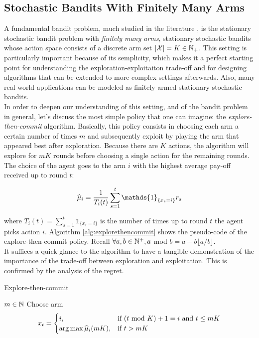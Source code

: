 \subsection{Stochastic Bandits With Finitely Many Arms}
A fundamental bandit problem, much studied in the literature \cite{lattimore2019bandit}, is the stationary stochastic bandit problem with \emph{finitely many arms}, \ie stationary stochastic bandits whose action space consists of a discrete arm set $|\mathcal{X}| = K \in \mathbb{N}_{+}$. This setting is particularly important because of its semplicity, which makes it a perfect starting point for understanding the exploration-exploitaiton trade-off and for designing algorithms that can be extended to more complex settings afterwards. Also, many real world applications can be modeled as finitely-armed stationary stochastic bandits. \\ In order to deepen our understanding of this setting, and of the bandit problem in general, let's discuss the most simple policy that one can imagine: the \emph{explore-then-commit} algorithm. Basically, this policy consists in choosing each arm a certain number of times $m$ and subsequently exploit by playing the arm that appeared best after exploration. Because there are $K$ actions, the algorithm will explore for $mK$ rounds before choosing a single action for the remaining rounds. The choice of the agent goes to the arm $i$ with the highest average pay-off received up to round $t$:

\begin{equation}
\wh{\mu}_i = \frac{1}{T_i(t)}\sum_{s=1}^{t}\mathds{1}_{\{x_s=i\}}r_s
\end{equation}

where $T_i(t)= \sum_{s=1}^{t}\mathds{1}_{\{x_s=i\}}$ is the number of times up to round $t$ the agent picks action $i$. Algorithm \ref{alg:explorethencommit} shows the pseudo-code of the explore-then-commit policy. Recall $\forall a,b\in\mathbb{N}^{+},a$ mod $b = a-b\lfloor a/b\rfloor$. \\ It suffices a quick glance to the algorithm to have a tangible demonstration of the importance of the trade-off between exploration and exploitation. This is confirmed by the analysis of the regret.

\begin{algorithm}[t]
	\caption{Explore-then-commit}
	\label{alg:explorethencommit}
	\begin{algorithmic}[1]
	 $m\in\mathbb{N}$
		\State Choose arm \begin{equation*} x_t = \begin{cases}i, &\text{if $(t$ mod $K)+1=i$ and $t\leq mK$} \\ \arg\max\widehat{\mu}_i(mK), &\text{if } t>mK\end{cases} \end{equation*}
	\EndFor
	\end{algorithmic}
\end{algorithm}

